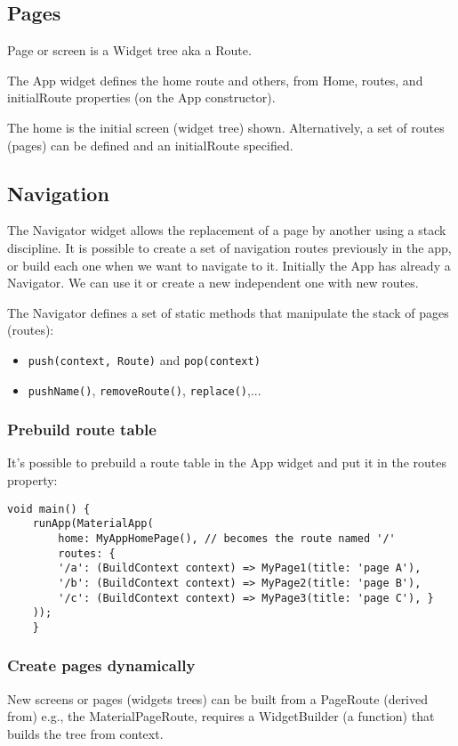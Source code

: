 \subsection{Pages}

Page or screen is a Widget tree aka a Route. 

The App widget defines the home route and others, from Home, routes, and initialRoute 
properties (on the App constructor).

The home is the initial screen (widget tree) shown. 
Alternatively, a set of routes (pages) can be defined and an initialRoute specified.

\subsection{Navigation}
The Navigator widget allows the replacement of a page by another using a stack discipline.
It is possible to create a set of navigation routes previously in the app, or build each one
when we want to navigate to it. Initially the App has already a Navigator. We can use it or
create a new independent one with new routes. 

The Navigator defines a set of static methods that manipulate the stack of pages (routes):

\begin{itemize}
    \item \texttt{push(context, Route)} and \texttt{pop(context)}
    \item \texttt{pushName()}, \texttt{removeRoute()}, \texttt{replace()},...
\end{itemize}

\subsubsection{Prebuild route table}
It's possible to prebuild a route table in the App widget and put it in the routes property: 
\begin{lstlisting}
void main() { 
    runApp(MaterialApp( 
        home: MyAppHomePage(), // becomes the route named '/' 
        routes: { 
        '/a': (BuildContext context) => MyPage1(title: 'page A'), 
        '/b': (BuildContext context) => MyPage2(title: 'page B'),   
        '/c': (BuildContext context) => MyPage3(title: 'page C'), }
    ));
    } 
\end{lstlisting}

\subsubsection{Create pages dynamically}
New screens or pages (widgets trees) can be built from a PageRoute (derived from)
e.g., the MaterialPageRoute, requires a WidgetBuilder (a function) that builds the tree
from context. 

